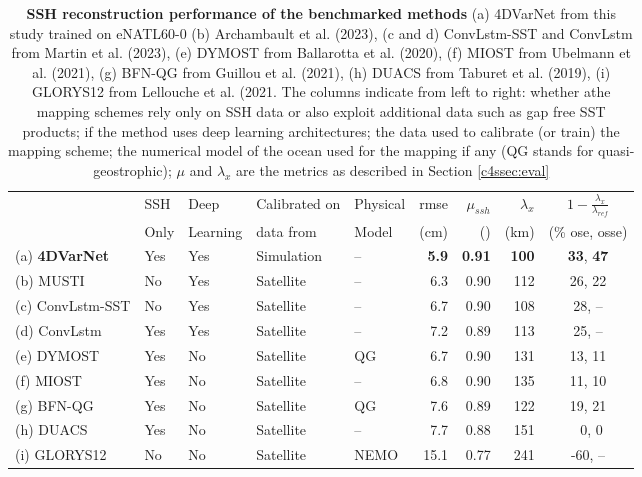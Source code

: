 \begin{bibunit}
\begin{table}[ht]
\hspace{-10mm}\begin{tabular}{l||llll|rrrc}
\toprule
 & SSH  & Deep  & Calibrated on  & Physical  & rmse & $\mu_{ssh}$  & $\lambda_x$ & $1 - \frac{\lambda_x}{\lambda_{ref}}$ \\
 &  Only &  Learning &  data from &  Model &  (cm) &  () &  (km) & (\% ose, osse) \\
\midrule
(a) \textbf{4DVarNet} &  Yes & Yes & Simulation  & -- & \textbf{5.9}  & \textbf{0.91}  & \textbf{100} & \textbf{33}, \textbf{47} \\
(b) MUSTI & No &  Yes & Satellite  & -- & 6.3  & 0.90  & 112 & 26, 22 \\
(c) ConvLstm-SST & No &  Yes & Satellite  & -- & 6.7  & 0.90  & 108 & 28, -- \\
(d) ConvLstm &  Yes &  Yes & Satellite  & -- & 7.2  & 0.89  & 113 & 25, -- \\
(e) DYMOST&  Yes & No & Satellite  & QG & 6.7  & 0.90  & 131 & 13, 11 \\
(f) MIOST &  Yes & No & Satellite  & -- & 6.8  & 0.90  & 135 & 11, 10 \\
(g) BFN-QG &  Yes & No & Satellite  & QG & 7.6  & 0.89  & 122 & 19, 21 \\
(h) DUACS &  Yes & No & Satellite  & -- & 7.7  & 0.88  & 151 &  ~0,  0 \\
(i) GLORYS12 & No & No & Satellite  & NEMO & 15.1  & 0.77  & 241 & -60, -- \\
\bottomrule
\end{tabular}
\caption{ \textbf{SSH reconstruction performance of the benchmarked methods} (a) 4DVarNet from this study trained on eNATL60-0 (b) Archambault et al. (2023), (c and d)
ConvLstm-SST and ConvLstm from Martin et al. (2023), (e) DYMOST from Ballarotta
et al. (2020), (f) MIOST from Ubelmann et al. (2021), (g) BFN-QG from Guillou et
al. (2021), (h) DUACS from Taburet et al. (2019), (i) GLORYS12 from Lellouche et al.
(2021. The columns indicate from left to right: whether athe mapping schemes rely only on SSH data or also exploit additional data such as gap free SST products; if the method uses deep learning architectures; the data used to calibrate (or train) the mapping scheme; the numerical model of the ocean used for the mapping if any (QG stands for quasi-geostrophic); $\mu$ and $\lambda_x$ are the metrics as described in Section \ref{c4ssec:eval}}
\label{c4tab:bench}
\end{table}


\end{bibunit}
